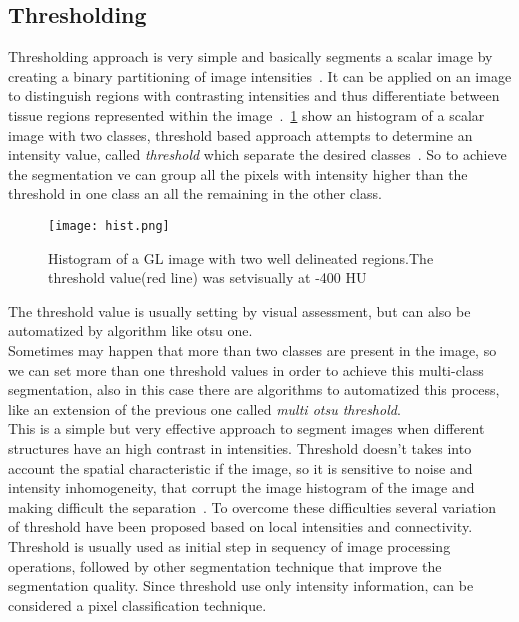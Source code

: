 \documentclass{standalone}
\begin{document}
\subsection{Thresholding}

Thresholding approach is very simple and basically segments a scalar image by creating a binary partitioning of image intensities~\cite{ART:Pham}. It can be applied on an image to distinguish regions with contrasting intensities and thus differentiate between tissue regions represented within the image~\cite{INP:Withey}. \figurename\,\ref{fig:Histogram} show an histogram of a scalar image with two classes, threshold based approach attempts to determine an intensity value, called \emph{threshold} which separate the desired classes~\cite{ART:Pham}. So to achieve the segmentation ve can group all the pixels with intensity higher than the threshold in one class an all the remaining in the other class. 

\begin{figure}[h!]

	\centering
		\texttt{[image: hist.png]}
	\caption{Histogram of a GL image with two well delineated regions.The threshold value(red line) was setvisually at -400 HU}\label{fig:Histogram}
\end{figure}

The threshold value is usually setting by visual assessment, but can also be automatized by algorithm like otsu one.\\
Sometimes may happen that more than two classes are present in the image, so we can set more than one threshold values in order to achieve this multi-class segmentation, also in this case there are algorithms to automatized this process, like an extension of the previous one called \emph{multi otsu threshold}.\\
This is a simple but very effective approach to segment images when different structures have an high contrast in intensities. Threshold doesn't takes into account the spatial characteristic if the image, so it is sensitive to noise and intensity inhomogeneity, that corrupt the image histogram of the image and making difficult the separation~\cite{ART:Pham}. To overcome these difficulties several variation of threshold have been proposed based on local intensities and connectivity. \\
Threshold is usually used as initial step in sequency of image processing operations, followed by other segmentation technique that improve the segmentation quality. 
Since threshold use only intensity information, can be considered a pixel classification technique. 
\end{document}
